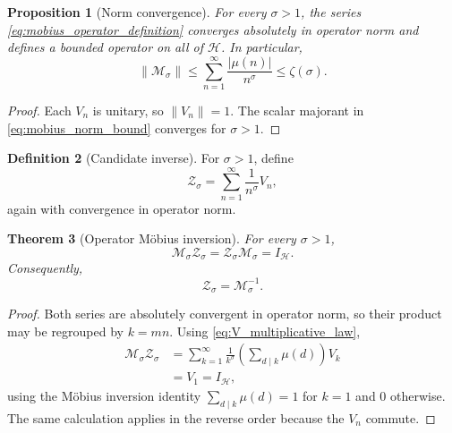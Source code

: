 \documentclass[11pt]{amsart}
\numberwithin{equation}{section}
\theoremstyle{plain}
\newtheorem{theorem}{Theorem}[section]
\newtheorem{proposition}[theorem]{Proposition}
\theoremstyle{definition}
\newtheorem{definition}[theorem]{Definition}
\theoremstyle{remark}
\newcommand{\Hil}{\mathcal{H}}
\begin{document}
\begin{proposition}[Norm convergence]
\label{prop:mobius_norm_convergence}
For every $\sigma>1$, the series
\eqref{eq:mobius_operator_definition} converges absolutely in operator norm
and defines a bounded operator on all of $\Hil$.  In particular,
\begin{equation}
\|\mathcal M_\sigma\|
\leq
\sum_{n=1}^{\infty}\frac{|\mu(n)|}{n^\sigma}
\leq\zeta(\sigma).
\label{eq:mobius_norm_bound}
\end{equation}
\end{proposition}

\begin{proof}
Each $V_n$ is unitary, so $\|V_n\|=1$.  The scalar majorant in
\eqref{eq:mobius_norm_bound} converges for $\sigma>1$.
\end{proof}

\begin{definition}[Candidate inverse]
\label{def:zeta_operator_bounded}
For $\sigma>1$, define
\begin{equation}
\mathcal Z_\sigma
=\sum_{n=1}^{\infty}\frac{1}{n^\sigma}V_n,
\label{eq:zeta_operator_definition}
\end{equation}
again with convergence in operator norm.
\end{definition}

\begin{theorem}[Operator M\"obius inversion]
\label{thm:operator_mobius_inversion}
For every $\sigma>1$,
\begin{equation}
\mathcal M_\sigma\mathcal Z_\sigma
=\mathcal Z_\sigma\mathcal M_\sigma
=I_{\Hil}.
\label{eq:operator_mobius_inversion}
\end{equation}
Consequently,
\begin{equation}
\mathcal Z_\sigma=\mathcal M_\sigma^{-1}.
\label{eq:zeta_as_mobius_inverse}
\end{equation}
\end{theorem}

\begin{proof}
Both series are absolutely convergent in operator norm, so their product
may be regrouped by $k=mn$.  Using
\eqref{eq:V_multiplicative_law},
\begin{align}
\mathcal M_\sigma\mathcal Z_\sigma
&=
\sum_{k=1}^{\infty}
\frac{1}{k^\sigma}
\left(\sum_{d\mid k}\mu(d)\right)V_k
\label{eq:mobius_product_regrouped}\\
&=V_1
=I_{\Hil},
\label{eq:mobius_product_identity}
\end{align}
using the M\"obius inversion identity
$\sum_{d\mid k}\mu(d)=1$ for $k=1$ and $0$ otherwise.  The same calculation
applies in the reverse order because the $V_n$ commute.
\end{proof}
\end{document}
